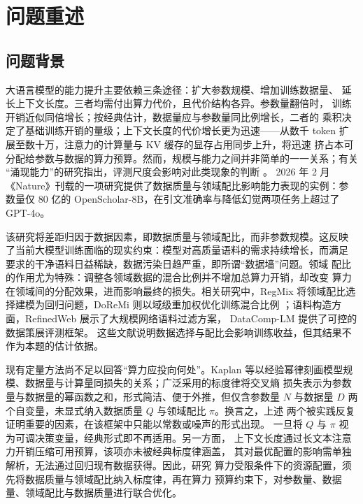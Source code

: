 \documentclass[bwprint]{gmcmthesis}
\numberwithin{equation}{section}
\numberwithin{figure}{section}
\numberwithin{table}{section}
\begin{document}
\pagestyle{plain}

\maketoc

\clearpage

\section{问题重述}


\subsection{问题背景}

大语言模型的能力提升主要依赖三条途径：扩大参数规模、增加训练数据量、
延长上下文长度。三者均需付出算力代价，且代价结构各异。参数量翻倍时，
训练开销近似同倍增长；按经典估计，数据量应与参数量同比例增长，二者的
乘积决定了基础训练开销的量级；上下文长度的代价增长更为迅速——从数千
token 扩展至数十万，注意力的计算量与 KV 缓存的显存占用同步上升，将迅速
挤占本可分配给参数与数据的算力预算。然而，规模与能力之间并非简单的一一关系；有关
“涌现能力”的研究指出，评测尺度会影响对此类现象的判断 \cite{schaeffer_emergent_2023}。
2026 年 2 月《Nature》刊载的一项研究提供了数据质量与领域配比影响能力表现的实例：参数量仅 80 亿的
OpenScholar-8B，在引文准确率与降低幻觉两项任务上超过了 GPT-4o\cite{asai_synthesizing_2026}。

该研究将差距归因于数据因素，即数据质量与领域配比，而非参数规模。这反映
了当前大模型训练面临的现实约束：模型对高质量语料的需求持续增长，而满足
要求的干净语料日益稀缺，数据污染日趋严重，即所谓“数据墙”问题。领域
配比的作用尤为特殊：调整各领域数据的混合比例并不增加总算力开销，却改变
算力在领域间的分配效果，进而影响最终的损失\cite{xia_regmix_2024}。相关研究中，RegMix 将领域配比选择建模为回归问题，DoReMi 则以域级重加权优化训练混合比例
\cite{xie_doremi_2024}；语料构造方面，RefinedWeb 展示了大规模网络语料过滤方案，
DataComp-LM 提供了可控的数据策展评测框架\cite{penedo_refinedweb_2023,li_datacomp_lm_2024}。
这些文献说明数据选择与配比会影响训练收益，但其结果不作为本题的估计依据。

现有定量方法尚不足以回答“算力应投向何处”。Kaplan 等以经验幂律刻画模型规模、数据量与计算量同损失的关系\cite{kaplan_scaling_2020}；广泛采用的标度律将交叉熵
损失表示为参数量与数据量的幂函数之和，形式简洁、便于外推，但仅含参数量
$N$ 与数据量 $D$ 两个自变量，未显式纳入数据质量 $Q$ 与领域配比
$\pi$\cite{hoffmann_training_2022,bahri_explaining_2024}。换言之，上述
两个被实践反复证明重要的因素，在该框架中只能以常数或噪声的形式出现。
一旦将 $Q$ 与 $\pi$ 视为可调决策变量，经典形式即不再适用。另一方面，
上下文长度通过长文本注意力开销压缩可用预算，该项亦未被经典标度律涵盖，
其对最优配置的影响需单独解析，无法通过回归现有数据获得。因此，研究
算力受限条件下的资源配置，须先将数据质量与领域配比纳入标度律，再在算力
预算约束下，对参数量、数据量、领域配比与数据质量进行联合优化。
\end{document}
